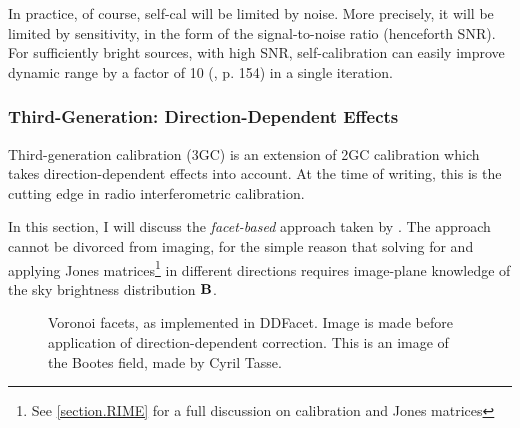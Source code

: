 \pg
In practice, of course, self-cal will be limited by noise. More precisely, it will be limited by sensitivity, in the form of the signal-to-noise ratio (henceforth SNR). For sufficiently bright sources, with high SNR, self-calibration can easily improve dynamic range by a factor of 10 (\cite{serendipitous}, p. 154) in a single iteration. 

\subsubsection{Third-Generation: Direction-Dependent Effects}

\pg
Third-generation calibration (3GC) is an extension of 2GC calibration which takes direction-dependent effects into account. At the time of writing, this is the cutting edge in radio interferometric calibration.

\pg
In this section, I will discuss the \emph{facet-based} approach taken by . The approach cannot be divorced from imaging, for the simple reason that solving for and applying Jones matrices\footnote{See \cref{section.RIME} for a full discussion on calibration and Jones matrices} in different directions requires image-plane knowledge of the sky brightness distribution $\textbf{B}$. %

\begin{figure}[ht]
\centering
{}
\caption{\label{fig.facets} Voronoi facets, as implemented in DDFacet. Image is made before application of direction-dependent correction. This is an image of the Bootes field, made by Cyril Tasse.}
\end{figure}

